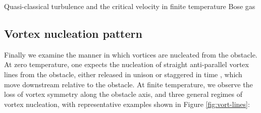 \begin{chapter}{\label{cha:nonequib}Quasi-classical turbulence and the critical velocity in finite temperature Bose gas}
\subsection{Vortex nucleation pattern}
Finally we examine the manner in which vortices are nucleated from the obstacle.  At zero temperature, one expects the nucleation of straight anti-parallel vortex lines from the obstacle, either released in unison or staggered in time \cite{frisch92,saito10,stagg_parker_14}, which move downstream relative to the obstacle.  At finite temperature, we observe the loss of vortex symmetry along the obstacle axis, and three general regimes of vortex nucleation, with representative examples shown in Figure  \ref{fig:vort-lines}:

\begin{figure}
    \centering
\end{figure}
\end{chapter}
